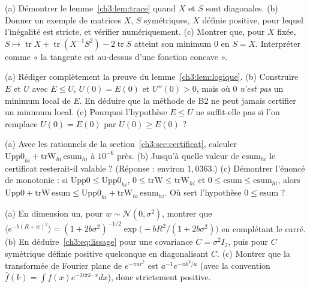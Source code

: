 \begin{exercise}\label{ch3:ex:trace2}
(a) Démontrer le lemme~\ref{ch3:lem:trace} quand $X$ et $S$ sont diagonales. (b) Donner un exemple de matrices $X$, $S$
symétriques, $X$ définie positive, pour lequel l'inégalité est stricte, et vérifier numériquement. (c) Montrer que, pour
$X$ fixée, $S\mapsto\operatorname{tr}X+\operatorname{tr}(X^{-1}S^2)-2\operatorname{tr}S$ atteint son minimum $0$ en
$S=X$. Interpréter comme « la tangente est au-dessus d'une fonction concave ».
\end{exercise}

\begin{exercise}\label{ch3:ex:logique}
(a) Rédiger complètement la preuve du lemme~\ref{ch3:lem:logique}. (b) Construire $E$ et $U$ avec $E\le U$, $U(0)=E(0)$
et $U''(0)>0$, mais où $0$ \emph{n'est pas} un minimum local de $E$. En déduire que la méthode de B2 ne peut jamais
certifier un minimum local. (c) Pourquoi l'hypothèse $E\le U$ ne suffit-elle pas si l'on remplace $U(0)=E(0)$ par
$U(0)\ge E(0)$ ?
\end{exercise}

\begin{exercise}\label{ch3:ex:cert}
(a) Avec les rationnels de la section~\ref{ch3:sec:certificat}, calculer $\mathrm{Upp0}_{hi}+\mathrm{trW}_{hi}\,\mathrm{esum}_{hi}$
à $10^{-6}$ près. (b) Jusqu'à quelle valeur de $\mathrm{esum}_{hi}$ le certificat resterait-il valable ? (Réponse :
environ $1{,}0363$.) (c) Démontrer l'énoncé de monotonie  : si $\mathrm{Upp0}\le\mathrm{Upp0}_{hi}$,
$0\le\mathrm{trW}\le\mathrm{trW}_{hi}$ et $0\le\mathrm{esum}\le\mathrm{esum}_{hi}$, alors
$\mathrm{Upp0}+\mathrm{trW}\,\mathrm{esum}\le\mathrm{Upp0}_{hi}+\mathrm{trW}_{hi}\,\mathrm{esum}_{hi}$. Où sert
l'hypothèse $0\le\mathrm{esum}$ ?
\end{exercise}

\begin{exercise}\label{ch3:ex:gauss}
(a) En dimension un, pour $w\sim\mathcal N(0,\sigma^2)$, montrer que
$\langle e^{-b(R+w)^2}\rangle=(1+2b\sigma^2)^{-1/2}\exp\bigl(-bR^2/(1+2b\sigma^2)\bigr)$ en complétant le carré.
(b) En déduire~\eqref{ch3:eq:lissage} pour une covariance $C=\sigma^2I_2$, puis pour $C$ symétrique définie positive
quelconque en diagonalisant $C$. (c) Montrer que la transformée de Fourier plane de $e^{-\pi ar^2}$ est
$a^{-1}e^{-\pi k^2/a}$ (avec la convention $\hat f(k)=\int f(x)e^{-2i\pi k\cdot x}dx$), donc strictement positive.
\end{exercise}

